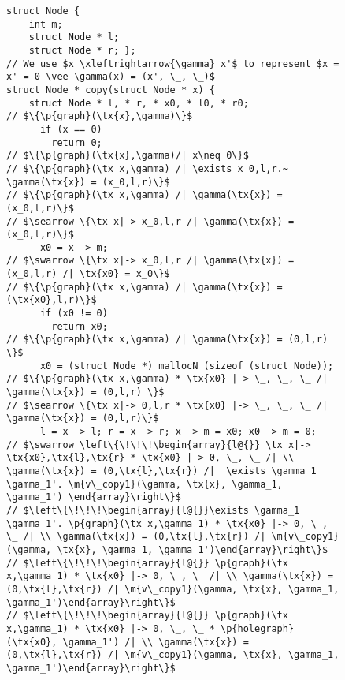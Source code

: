 \documentclass[acmsmall,review,anonymous]{acmart}\settopmatter{printfolios=true,printccs=false,printacmref=false}
\newcommand{\tx}[1]{\text{#1}}
\newcommand{\p}[1]{\ensuremath{\mathsf{#1}}} \newcommand{\m}[1]{\ensuremath{\mathit{#1}}} \newcommand{\ma}[1]{\ensuremath{\mathcal{#1}}} \let\ramify\lightning
\begin{document}
\begin{figure}
  \begin{lstlisting}
struct Node {
    int m;
    struct Node * l;
    struct Node * r; };
// We use $x \xleftrightarrow{\gamma} x'$ to represent $x = x' = 0 \vee \gamma(x) = (x', \_, \_)$
struct Node * copy(struct Node * x) { 
    struct Node * l, * r, * x0, * l0, * r0;
// $\{\p{graph}(\tx{x},\gamma)\}$
      if (x == 0)
        return 0;
// $\{\p{graph}(\tx{x},\gamma)/| x\neq 0\}$
// $\{\p{graph}(\tx x,\gamma) /| \exists x_0,l,r.~ \gamma(\tx{x}) = (x_0,l,r)\}$
// $\{\p{graph}(\tx x,\gamma) /| \gamma(\tx{x}) = (x_0,l,r)\}$
// $\searrow \{\tx x|-> x_0,l,r /| \gamma(\tx{x}) = (x_0,l,r)\}$
      x0 = x -> m;
// $\swarrow \{\tx x|-> x_0,l,r /| \gamma(\tx{x}) = (x_0,l,r) /| \tx{x0} = x_0\}$
// $\{\p{graph}(\tx x,\gamma) /| \gamma(\tx{x}) = (\tx{x0},l,r)\}$
      if (x0 != 0)
        return x0;
// $\{\p{graph}(\tx x,\gamma) /| \gamma(\tx{x}) = (0,l,r) \}$
      x0 = (struct Node *) mallocN (sizeof (struct Node));
// $\{\p{graph}(\tx x,\gamma) * \tx{x0} |-> \_, \_, \_ /| \gamma(\tx{x}) = (0,l,r) \}$
// $\searrow \{\tx x|-> 0,l,r * \tx{x0} |-> \_, \_, \_ /| \gamma(\tx{x}) = (0,l,r)\}$
      l = x -> l; r = x -> r; x -> m = x0; x0 -> m = 0;
// $\swarrow \left\{\!\!\!\begin{array}{l@{}} \tx x|-> \tx{x0},\tx{l},\tx{r} * \tx{x0} |-> 0, \_, \_ /| \\ \gamma(\tx{x}) = (0,\tx{l},\tx{r}) /|  \exists \gamma_1 \gamma_1'. \m{v\_copy1}(\gamma, \tx{x}, \gamma_1, \gamma_1') \end{array}\right\}$
// $\left\{\!\!\!\begin{array}{l@{}}\exists \gamma_1 \gamma_1'. \p{graph}(\tx x,\gamma_1) * \tx{x0} |-> 0, \_, \_ /| \\ \gamma(\tx{x}) = (0,\tx{l},\tx{r}) /| \m{v\_copy1}(\gamma, \tx{x}, \gamma_1, \gamma_1')\end{array}\right\}$
// $\left\{\!\!\!\begin{array}{l@{}} \p{graph}(\tx x,\gamma_1) * \tx{x0} |-> 0, \_, \_ /| \\ \gamma(\tx{x}) = (0,\tx{l},\tx{r}) /| \m{v\_copy1}(\gamma, \tx{x}, \gamma_1, \gamma_1')\end{array}\right\}$
// $\left\{\!\!\!\begin{array}{l@{}} \p{graph}(\tx x,\gamma_1) * \tx{x0} |-> 0, \_, \_ * \p{holegraph}(\tx{x0}, \gamma_1') /| \\ \gamma(\tx{x}) = (0,\tx{l},\tx{r}) /| \m{v\_copy1}(\gamma, \tx{x}, \gamma_1, \gamma_1')\end{array}\right\}$

\end{lstlisting}
\end{figure}
\end{document}
